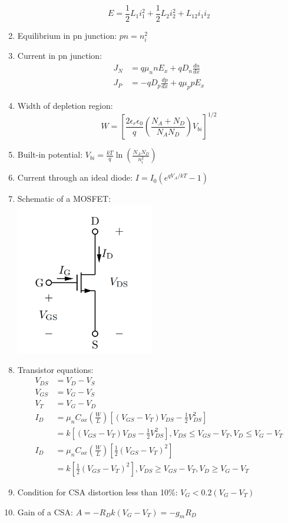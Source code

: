 \documentclass[twocolumn]{article}
\begin{document}
\begin{enumerate}
    \[E = \frac{1}{2}L_1i_1^2 + \frac{1}{2}L_2i_2^2 + L_{12}i_1i_2\]
    \item Equilibrium in pn junction: $pn = n_i^2$
    \item Current in pn junction: 
    \begin{align*}
        J_N &= q\mu_n n E_x + qD_n \frac{dn}{dx} \\
        J_P &= -qD_p \frac{dp}{dx} + q\mu_p p E_x
    \end{align*}
    \item Width of depletion region: 
    \[W = \left[\frac{2\epsilon_r \epsilon_0}{q} \left(\frac{N_A + N_D}{N_A N_D}\right) V_{bi}\right]^{1/2}\]
    \item Built-in potential: $V_{bi} = \frac{kT}{q}\ln{\left(\frac{N_AN_D}{n_i^2}\right)}$
    \item Current through an ideal diode: $I = I_0(e^{qV_A / kT} - 1)$
    
    \newpage
    \item Schematic of a MOSFET: \\
        \includegraphics[width=6cm]{images/mosfet.png}
    \item Transistor equations: 
    \begin{align*}
        V_{DS} &= V_D -V_S\\
        V_{GS} &= V_G - V_S \\
        V_T &= V_G - V_D \\
        I_D &= \mu_n C_{ox} \left(\frac{W}{L}\right) \left[(V_{GS} - V_T)V_{DS} - \frac{1}{2} V_{DS}^2\right] \\
        &= k\left[(V_{GS} - V_T)V_{DS} - \frac{1}{2} V_{DS}^2\right], V_{DS} \leq V_{GS} - V_T, V_D \leq V_G - V_T \\
        I_D &= \mu_n C_{ox} \left(\frac{W}{L}\right) \left[\frac{1}{2} (V_{GS}-V_T)^2\right] \\
        &= k \left[\frac{1}{2} (V_{GS}-V_T)^2\right], V_{DS} \geq V_{GS} - V_T, V_D \geq V_G - V_T
    \end{align*}
    \item Condition for CSA distortion less than 10\%: $V_G < 0.2(V_G-V_T)$
    \item Gain of a CSA: $A = -R_Dk(V_G-V_T)=-g_m R_D$
\end{enumerate}
\end{document}
